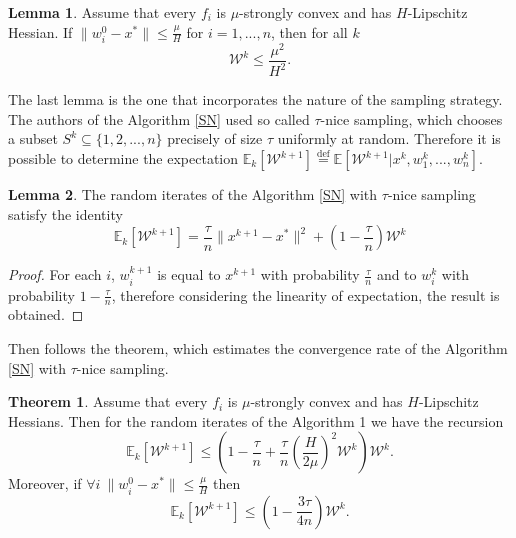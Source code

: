 \documentclass{article}
\theoremstyle{definition}
\theoremstyle{assumption}
\theoremstyle{lemma}
\newtheorem{lemma}{Lemma}
\theoremstyle{theorem}
\newtheorem{theorem}{Theorem}
\theoremstyle{proposition}
\begin{document}
	\begin{lemma}\label{lemma:2}
		Assume that every $f_i$ is $\mu$-strongly convex and has $H$-Lipschitz Hessian. If $\|w_i^0 - x^*\| \leqslant \frac{\mu}{H}$ for $i = 1, ..., n$, then for all $k$
		\begin{equation}
			\mathcal W^k \leqslant \frac{\mu^2}{H^2}.
		\end{equation}
	\end{lemma}

	The last lemma is the one that incorporates the nature of the sampling strategy. The authors of the Algorithm \ref{SN} used so called $\tau$-nice sampling, which chooses a subset $S^{k} \subseteq \{ 1, 2, ..., n \}$ precisely of size $\tau$ uniformly at random. Therefore it is possible to determine the expectation $\mathbb E_k[\mathcal W^{k+1}] \overset{\text{def}} = \mathbb E[\mathcal W^{k+1} | x^k, w_1^k, ..., w_n^k]$.

	\begin{lemma}\label{lemma:3}
		The random iterates of the Algorithm \ref{SN} with $\tau$-nice sampling satisfy the identity
		\begin{equation}
			\mathbb E_k[\mathcal W^{k+1}] = \frac{\tau}{n} \| x^{k+1} - x^* \|^2 + \left(1 - \frac{\tau}{n}\right) \mathcal W^k
		\end{equation}
	\end{lemma}
	\begin{proof}
		For each $i$, $w_i^{k+1}$ is equal to $x^{k+1}$ with probability $\frac{\tau}{n}$ and to $w_i^k$ with probability $1 - \frac{\tau}{n}$, therefore considering the linearity of expectation, the result is obtained.
	\end{proof}

	Then follows the theorem, which estimates the convergence rate of the Algorithm \ref{SN} with $\tau$-nice sampling.
	
	\begin{theorem} \label{theorem:1}
		Assume that every $f_i$ is $\mu$-strongly convex and has $H$-Lipschitz Hessians. Then for the random iterates of the Algorithm 1 we have the recursion
		\begin{equation}
			\mathbb E_k[\mathcal W^{k+1}] \leqslant \left( 1 - \frac{\tau}{n} + \frac{\tau}{n} \left( \frac{H}{2\mu} \right)^2 \mathcal W^k \right) \mathcal W^k.
		\end{equation}
		Moreover, if $\forall i\ \|w_i^0 - x^*\| \leqslant \frac{\mu}{H}$ then
		\begin{equation}
			\mathbb E_k[\mathcal W^{k+1}] \leqslant \left( 1 - \frac{3\tau}{4n} \right) \mathcal W^k.
		\end{equation}
	\end{theorem}
	
\end{document}
